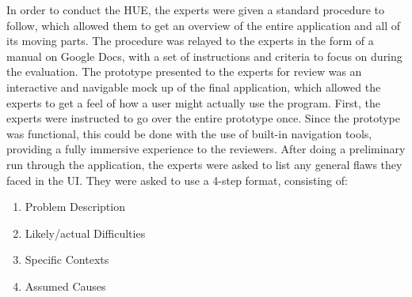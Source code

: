 In order to conduct the HUE, the experts were given a standard procedure to follow, which allowed them to get an overview of the entire application and all of its moving parts.
The procedure was relayed to the experts in the form of a manual on Google Docs, with a set of instructions and criteria to focus on during the evaluation.
The prototype presented to the experts for review was an interactive and navigable mock up of the final application, which allowed the experts to get a feel of how a user might actually use the program.
First, the experts were instructed to go over the entire prototype once.
Since the prototype was functional, this could be done with the use of built-in navigation tools, providing a fully immersive experience to the reviewers.
After doing a preliminary run through the application, the experts were asked to list any general flaws they faced in the UI. They were asked to use a 4-step format, consisting of:

\begin{enumerate}
    \item Problem Description
    \item Likely/actual Difficulties
    \item Specific Contexts
    \item Assumed Causes
\end{enumerate}

